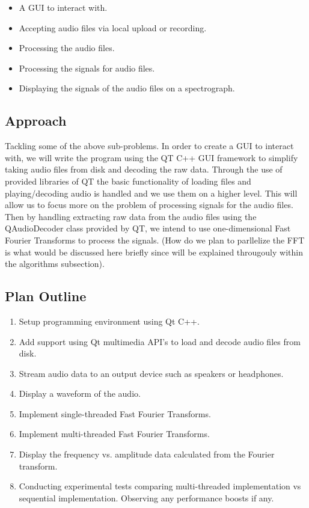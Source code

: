 \documentclass[journal]{IEEEtran}
\begin{document}
\begin{itemize}
	\item A GUI to interact with.
	\item Accepting audio files via local upload or recording.
	\item Processing the audio files.
	\item Processing the signals for audio files.
	\item Displaying the signals of the audio files on a spectrograph.
\end{itemize}

\subsection{Approach}
	\par Tackling some of the above sub-problems. In order to create a GUI to interact with, we will write the program using the QT C++ GUI framework to simplify taking audio files from disk and decoding the raw data. Through the use of provided libraries of QT the basic functionality of loading files and playing/decoding audio is handled and we use them on a higher level. This will allow us to focus more on the problem of processing signals for the audio files. Then by handling extracting raw data from the audio files using the QAudioDecoder class provided by QT, we intend to use one-dimensional Fast Fourier Transforms to process the signals. (How do we plan to parllelize the FFT is what would be discussed here briefly since will be explained througouly within the algorithms subsection).

\subsection{Plan Outline}

\begin{enumerate}
	\item Setup programming environment using Qt C++.
	\item Add support using Qt multimedia API's to load and decode audio files from disk.
	\item Stream audio data to an output device such as speakers or headphones.
	\item Display a waveform of the audio.
	\item Implement single-threaded Fast Fourier Transforms.
	\item Implement multi-threaded Fast Fourier Transforms.
	\item Display the frequency vs. amplitude data calculated from the Fourier transform.
	\item Conducting experimental tests comparing multi-threaded implementation vs sequential implementation. 
Observing any performance boosts if any.
\end{enumerate}
\end{document}
